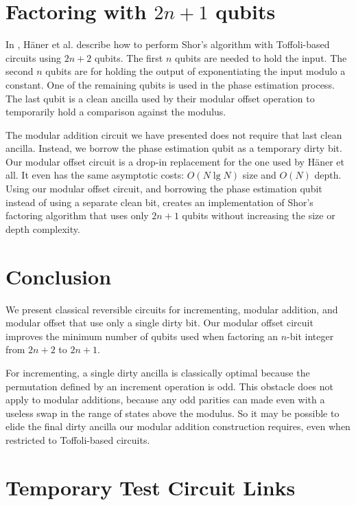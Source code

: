 \documentclass[twocolumn]{article}
\begin{document}
\section{Factoring with $2n+1$ qubits} \label{sec:applications}

In \cite{haner2016}, H\"{a}ner et al. describe how to perform Shor's algorithm with Toffoli-based circuits using $2n+2$ qubits.
The first $n$ qubits are needed to hold the input.
The second $n$ qubits are for holding the output of exponentiating the input modulo a constant.
One of the remaining qubits is used in the phase estimation process.
The last qubit is a clean ancilla used by their modular offset operation to temporarily hold a comparison against the modulus.

The modular addition circuit we have presented does not require that last clean ancilla.
Instead, we borrow the phase estimation qubit as a temporary dirty bit.
Our modular offset circuit is a drop-in replacement for the one used by H\"{a}ner et all.
It even has the same asymptotic costs: $O(N \lg N)$ size and $O(N)$ depth.
Using our modular offset circuit, and borrowing the phase estimation qubit instead of using a separate clean bit, creates an implementation of Shor's factoring algorithm that uses only $2n+1$ qubits without increasing the size or depth complexity.

\section{Conclusion} \label{sec:conclusion}

We present classical reversible circuits for incrementing, modular addition, and modular offset that use only a single dirty bit.
Our modular offset circuit improves the minimum number of qubits used when factoring an $n$-bit integer from $2n+2$ to $2n+1$.

For incrementing, a single dirty ancilla is classically optimal because the permutation defined by an increment operation is odd.
This obstacle does not apply to modular additions, because any odd parities can made even with a useless swap in the range of states above the modulus.
So it may be possible to elide the final dirty ancilla our modular addition construction requires, even when restricted to Toffoli-based circuits.




\section{Temporary Test Circuit Links}
\end{document}
